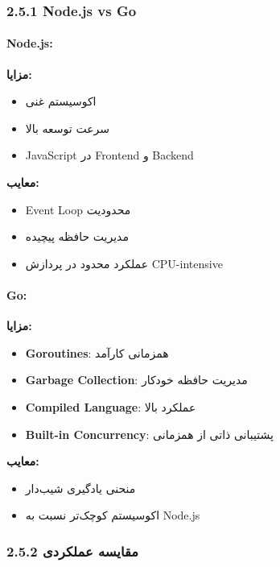\documentclass[
]{article}
\providecommand{\tightlist}{%
  \setlength{\itemsep}{0pt}\setlength{\parskip}{0pt}}
\begin{document}
\subsubsection{2.5.1 Node.js vs Go}\label{node.js-vs-go}

\paragraph{Node.js:}\label{node.js}

\textbf{مزایا:}

\begin{itemize}
\tightlist
\item
  اکوسیستم غنی
\item
  سرعت توسعه بالا
\item
  JavaScript در Frontend و Backend
\end{itemize}

\textbf{معایب:}

\begin{itemize}
\tightlist
\item
  Event Loop محدودیت
\item
  مدیریت حافظه پیچیده
\item
  عملکرد محدود در پردازش CPU-intensive
\end{itemize}

\paragraph{Go:}\label{go}

\textbf{مزایا:}

\begin{itemize}
\tightlist
\item
  \textbf{Goroutines}: همزمانی کارآمد
\item
  \textbf{Garbage Collection}: مدیریت حافظه خودکار
\item
  \textbf{Compiled Language}: عملکرد بالا
\item
  \textbf{Built-in Concurrency}: پشتیبانی ذاتی از همزمانی
\end{itemize}

\textbf{معایب:}

\begin{itemize}
\tightlist
\item
  منحنی یادگیری شیب‌دار
\item
  اکوسیستم کوچک‌تر نسبت به Node.js
\end{itemize}

\subsubsection{2.5.2 مقایسه
عملکردی}\label{ux645ux642ux627ux6ccux633ux647-ux639ux645ux644ux6a9ux631ux62fux6cc}
\end{document}

